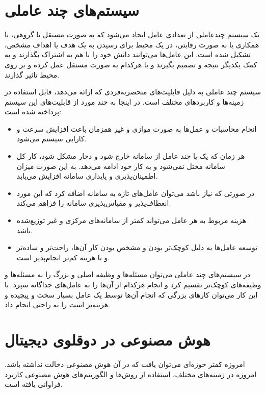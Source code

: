 \section{سیستم‌های چند ‌عاملی}
یک سیستم چندعاملی از تعدادی عامل ایجاد می‌شود که به صورت مستقل یا گروهی، با همکاری یا به صورت رقابتی، در یک محیط برای رسیدن به یک هدف یا اهداف مشخص، تشکیل شده است. این عامل‌ها می‌توانند دانش خود را با هم به اشتراک بگذارند و به کمک یکدیگر نتیجه و تصمیم بگیرند و یا هرکدام به صورت مستقل عمل کرده و بر روی محیط تاثیر گذارند.

سیستم‌ چند عاملی به دلیل قابلیت‌های منحصربه‌فردی که ارائه می‌دهد، قابل استفاده در زمینه‌ها و کاربرد‌های مختلف است. در اینجا به چند مورد از قابلیت‌های این سیستم ‌پرداخته‌ شده است:\cite{b5}

\begin{itemize}
	\item
	انجام محاسبات و عمل‌ها به صورت موازی و غیر همزمان باعث افزایش سرعت و کارایی سیستم می‌شود.
	\item 
	هر زمان که یک یا چند عامل از سامانه خارج شود و دچار مشکل شود، کار کل سامانه مختل نمی‌شود و به کار خود ادامه می‌دهد. به این صورت میزان اطمینان‌پذیری و پایداری سامانه افزایش می‌یابد.
	
	\item
	در صورتی که نیاز باشد می‌توان عامل‌های تازه به سامانه اضافه کرد که این مورد انعطاف‌پذیر و مقیاس‌پذیری سامانه را فراهم می‌کند.
	
	\item 
	هزینه مربوط به هر عامل می‌تواند کمتر از سامانه‌های مرکزی و غیر توزیع‌شده باشد.
	\item 
	توسعه عامل‌ها به دلیل کوچک‌تر بودن و مشخص بودن کار آن‌ها، راحت‌تر و ساده‌تر و با هزینه کم‌تر انجام‌پذیر است.
	
\end{itemize}

در سیستم‌‌های چند عاملی می‌توان مسئله‌ها و وظیفه اصلی و بزرگ را به مسئله‌ها و وظیفه‌های کوچک‌تر تقسیم کرد و انجام هرکدام از آن‌ها را به عامل‌های جداگانه سپرد. با این کار می‌توان کار‌های بزرگی که انجام آن‌ها توسط یک عامل بسیار سخت و پیچیده  و هزینه‌بر است را به راحتی انجام داد.\cite{b6}

\section{هوش مصنوعی در دوقلو‌ی دیجیتال}

امروزه کمتر حوزه‌ای می‌توان یافت که در آن هوش مصنوعی دخالت نداشته‌ باشد. امروزه در زمینه‌های مختلف، استفاده از روش‌ها و الگوریتم‌های هوش مصنوعی کاربرد فراوانی یافته است. 

